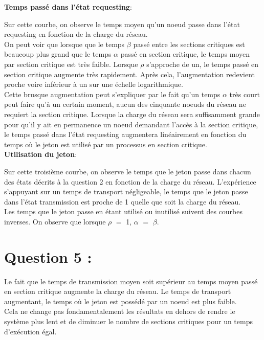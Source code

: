 \documentclass[11pt,a4paper]{report}
\begin{document}
\textbf{Temps passé dans l'état requesting}:

Sur cette courbe, on observe le temps moyen qu'un noeud passe dans l'état requesting en fonction de la charge du réseau.\\

On peut voir que lorsque que le temps $\beta$ passé entre les sections critiques est beaucoup plus grand que le temps $\alpha$ passé en section critique, le temps moyen par section critique est très faible. Lorsque $\rho$ s'approche de un, le temps passé en section critique augmente très rapidement. Après cela, l'augmentation redevient proche voire inférieur à un sur une échelle logarithmique.\\

Cette brusque augmentation peut s'expliquer par le fait qu'un temps $\alpha$ très court peut faire qu'à un certain moment, aucun des cinquante noeuds du réseau ne requiert la section critique. Lorsque la charge du réseau sera suffisamment grande pour qu'il y ait en permanence un noeud demandant l'accès à la section critique, le temps passé dans l'état requesting augmentera linéairement en fonction du temps où le jeton est utilisé par un processus en section critique.\\

\textbf{Utilisation du jeton}:

Sur cette troisième courbe, on observe le temps que le jeton passe dans chacun des états décrits à la question 2 en fonction de la charge du réseau. L'expérience s'appuyant sur un temps de transport négligeable, le temps que le jeton passe dans l'état transmission est proche de 1 quelle que soit la charge du réseau.\\

Les temps que le jeton passe en étant utilisé ou inutilisé suivent des courbes inverses. On observe que lorsque $\rho$ $=$ 1, $\alpha$ $=$ $\beta$.\\


\section{Question 5 :}

Le fait que le temps de transmission moyen soit supérieur au temps moyen passé en section critique augmente la charge du réseau. Le temps de transport augmentant, le temps où le jeton est possédé par un noeud est plus faible.\\

Cela ne change pas fondamentalement les résultats en dehors de rendre le système plus lent et de diminuer le nombre de sections critiques pour un temps d'exécution égal.\\
\end{document}
